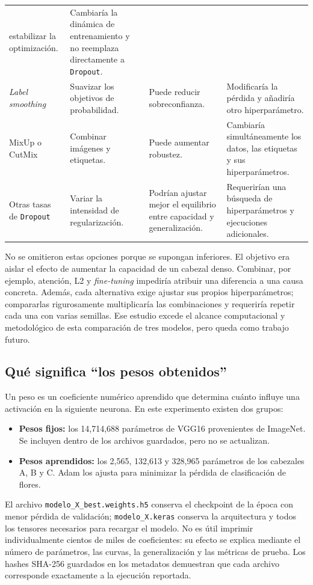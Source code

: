 \documentclass[11pt,letterpaper]{article}
\begin{document}
\begin{longtable}{@{}>{\raggedright\arraybackslash}p{}
>{\raggedright\arraybackslash}p{}
>{\raggedright\arraybackslash}p{}
>{\raggedright\arraybackslash}p{}@{}}
estabilizar la optimización. & Cambiaría la dinámica de entrenamiento y no
reemplaza directamente a \texttt{Dropout}.\\
\emph{Label smoothing} & Suavizar los objetivos de probabilidad. & Puede
reducir sobreconfianza. & Modificaría la pérdida y añadiría otro
hiperparámetro.\\
MixUp o CutMix & Combinar imágenes y etiquetas. & Puede aumentar robustez. &
Cambiaría simultáneamente los datos, las etiquetas y sus hiperparámetros.\\
Otras tasas de \texttt{Dropout} & Variar la intensidad de regularización. &
Podrían ajustar mejor el equilibrio entre capacidad y generalización. &
Requerirían una búsqueda de hiperparámetros y ejecuciones adicionales.\\
\end{longtable}
\endgroup

No se omitieron estas opciones porque se supongan inferiores. El objetivo era
aislar el efecto de aumentar la capacidad de un cabezal denso. Combinar, por
ejemplo, atención, L2 y \emph{fine-tuning} impediría atribuir una diferencia a
una causa concreta. Además, cada alternativa exige ajustar sus propios
hiperparámetros; compararlas rigurosamente multiplicaría las combinaciones y
requeriría repetir cada una con varias semillas. Ese estudio excede el alcance
computacional y metodológico de esta comparación de tres modelos, pero queda
como trabajo futuro.

\subsection{Qué significa ``los pesos obtenidos''}
Un peso es un coeficiente numérico aprendido que determina cuánto influye una
activación en la siguiente neurona. En este experimento existen dos grupos:

\begin{itemize}
\item \textbf{Pesos fijos:} los 14,714,688 parámetros de VGG16 provenientes de
ImageNet. Se incluyen dentro de los archivos guardados, pero no se actualizan.
\item \textbf{Pesos aprendidos:} los 2,565, 132,613 y 328,965 parámetros de los
cabezales A, B y C. Adam los ajusta para minimizar la pérdida de clasificación
de flores.
\end{itemize}

El archivo \texttt{modelo\_X\_best.weights.h5} conserva el checkpoint de la
época con menor pérdida de validación; \texttt{modelo\_X.keras} conserva la
arquitectura y todos los tensores necesarios para recargar el modelo. No es
útil imprimir individualmente cientos de miles de coeficientes: su efecto se
explica mediante el número de parámetros, las curvas, la generalización y las
métricas de prueba. Los hashes SHA-256 guardados en los metadatos demuestran
que cada archivo corresponde exactamente a la ejecución reportada.
\end{document}
